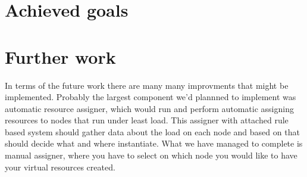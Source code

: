 \documentclass[11pt]{book}
\begin{document}
		

    \section{Achieved goals}
	
		

    \section{Further work}
	
	In terms of the future work there are many many improvments that might be implemented. Probably the largest component we'd plannned to implement was automatic resource assigner, which would run
        and perform automatic assigning resources to nodes that run under least load. This assigner with attached rule based system should gather data about the load on each node and based on that should 
        decide what and where instantiate. What we have managed to complete is manual assigner, where you have to select on which node you would like to have your virtual resources created.


  
  
	

\end{document}
